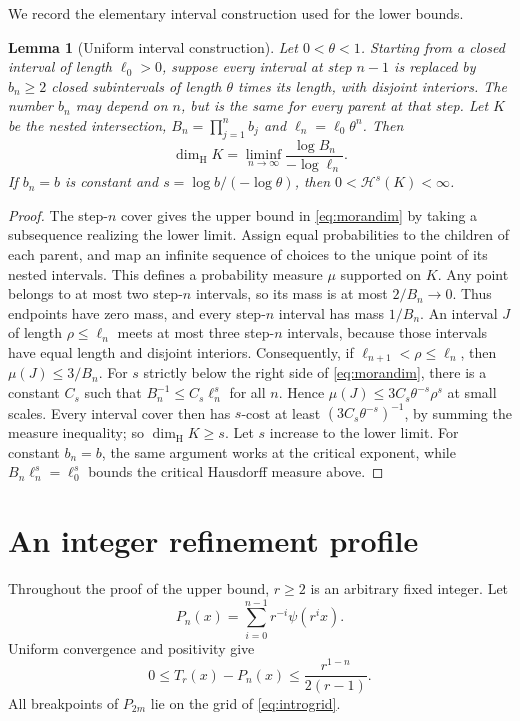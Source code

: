 \documentclass[11pt]{article}
\newtheorem{lemma}[theorem]{Lemma}
\theoremstyle{definition}
\theoremstyle{remark}
\newcommand{\dimH}{\dim_{\mathrm H}}
\newcommand{\HH}{\mathcal H}
\begin{document}
We record the elementary interval construction used for the lower bounds.
\begin{lemma}[Uniform interval construction]\label{lem:moran}
Let $0<\theta<1$. Starting from a closed interval of length $\ell_0>0$,
suppose every interval at step $n-1$ is replaced by $b_n\ge2$ closed
subintervals of length $\theta$ times its length, with disjoint interiors.
The number $b_n$ may depend on $n$, but is the same for every parent at that
step. Let $K$ be the nested intersection, $B_n=\prod_{j=1}^nb_j$ and
$\ell_n=\ell_0\theta^n$. Then
\begin{equation}\label{eq:morandim}
 \dimH K=\liminf_{n\to\infty}\frac{\log B_n}{-\log\ell_n}.
\end{equation}
If $b_n=b$ is constant and $s=\log b/(-\log\theta)$, then
$0<\HH^s(K)<\infty$.
\end{lemma}
\begin{proof}
The step-$n$ cover gives the upper bound in \cref{eq:morandim} by taking
a subsequence realizing the lower limit. Assign equal probabilities to the
children of each parent, and map an infinite sequence of choices to the
unique point of its nested intervals. This defines a probability measure
$\mu$ supported on $K$. Any point belongs to at most two step-$n$
intervals, so its mass is at most $2/B_n\to0$. Thus endpoints have zero
mass, and every step-$n$ interval has mass $1/B_n$.
An interval $J$ of length $\rho\le\ell_n$ meets at most three step-$n$
intervals, because those intervals have equal length and disjoint interiors.
Consequently, if $\ell_{n+1}<\rho\le\ell_n$, then
$\mu(J)\le3/B_n$.
For $s$ strictly below the right side of \cref{eq:morandim}, there is a
constant $C_s$ such that $B_n^{-1}\le C_s\ell_n^s$ for all $n$. Hence
$\mu(J)\le3C_s\theta^{-s}\rho^s$ at small scales. Every interval cover
then has $s$-cost at least $(3C_s\theta^{-s})^{-1}$, by summing the measure
inequality; so $\dimH K\ge s$. Let $s$ increase to the lower limit.
For constant $b_n=b$, the same argument works at the critical exponent,
while $B_n\ell_n^s=\ell_0^s$ bounds the critical Hausdorff measure above.
\end{proof}

\section{An integer refinement profile}\label{sec:profile}
Throughout the proof of the upper bound, $r\ge2$ is an arbitrary fixed
integer. Let
\[
 P_n(x)=\sum_{i=0}^{n-1}r^{-i}\psi(r^ix).
\]
Uniform convergence and positivity give
\begin{equation}\label{eq:tail}
 0\le T_r(x)-P_n(x)\le\frac{r^{1-n}}{2(r-1)}.
\end{equation}
All breakpoints of $P_{2m}$ lie on the grid of \cref{eq:introgrid}.
\end{document}
